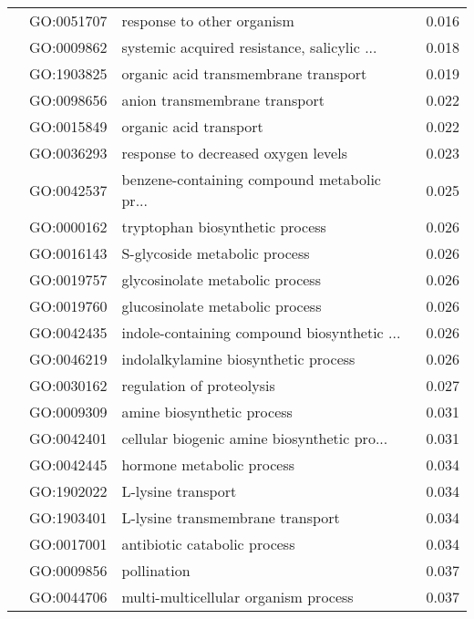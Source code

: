 \begin{longtable}{lllr}
   & GO:0051707 &                   response to other organism &         0.016 \\
   & GO:0009862 &  systemic acquired resistance, salicylic ... &         0.018 \\
   & GO:1903825 &         organic acid transmembrane transport &         0.019 \\
   & GO:0098656 &                anion transmembrane transport &         0.022 \\
   & GO:0015849 &                       organic acid transport &         0.022 \\
   & GO:0036293 &          response to decreased oxygen levels &         0.023 \\
   & GO:0042537 &  benzene-containing compound metabolic pr... &         0.025 \\
   & GO:0000162 &              tryptophan biosynthetic process &         0.026 \\
   & GO:0016143 &                S-glycoside metabolic process &         0.026 \\
   & GO:0019757 &              glycosinolate metabolic process &         0.026 \\
   & GO:0019760 &              glucosinolate metabolic process &         0.026 \\
   & GO:0042435 &  indole-containing compound biosynthetic ... &         0.026 \\
   & GO:0046219 &         indolalkylamine biosynthetic process &         0.026 \\
   & GO:0030162 &                    regulation of proteolysis &         0.027 \\
   & GO:0009309 &                   amine biosynthetic process &         0.031 \\
   & GO:0042401 &  cellular biogenic amine biosynthetic pro... &         0.031 \\
   & GO:0042445 &                    hormone metabolic process &         0.034 \\
   & GO:1902022 &                           L-lysine transport &         0.034 \\
   & GO:1903401 &             L-lysine transmembrane transport &         0.034 \\
   & GO:0017001 &                 antibiotic catabolic process &         0.034 \\
   & GO:0009856 &                                  pollination &         0.037 \\
   & GO:0044706 &         multi-multicellular organism process &         0.037 \\

\end{longtable}
